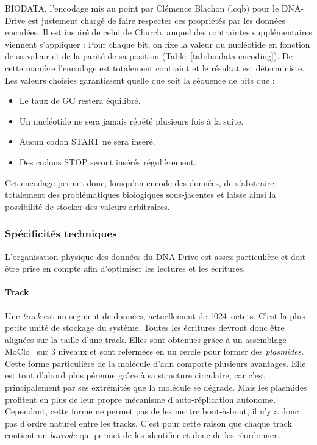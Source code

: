 \documentclass[a4paper]{report}
\begin{document}
BIODATA, l'encodage mis au point par Clémence Blachon (\ac{lcqb}) pour le DNA-Drive
est justement chargé de faire respecter ces propriétés par les données encodées.
Il est inspiré de celui de Church, auquel des contraintes supplémentaires viennent s'appliquer :
Pour chaque bit, on fixe la valeur du nucléotide en fonction de sa valeur et de la parité de sa position (Table~\ref{tab:biodata-encoding}).
De cette manière l'encodage est totalement contraint et le résultat est déterministe.
Les valeurs choisies garantissent quelle que soit la séquence de bits que :

\begin{itemize}
  \item Le taux de GC restera équilibré.
  \item Un nucléotide ne sera jamais répété plusieurs fois à la suite.
  \item Aucun codon START ne sera inséré.
  \item Des codons STOP seront insérés régulièrement.
\end{itemize}

Cet encodage permet donc, lorsqu'on encode des données, de s'abstraire totalement des problématiques biologiques sous-jacentes
et laisse ainsi la possibilité de stocker des valeurs arbitraires.

\subsubsection{Spécificités techniques}

L'organisation physique des données du DNA-Drive est assez particulière
et doit être prise en compte afin d'optimiser les lectures et les écritures.

\paragraph{Track} Une \emph{track} est un segment de données, actuellement de 1024~octets.
C'est la plus petite unité de stockage du système.
Toutes les écritures devront donc être alignées sur la taille d'une track.
Elles sont obtenues grâce à un assemblage MoClo~\cite{werner2012fast} sur 3 niveaux
et sont refermées en un cercle pour former des \emph{plasmides}.
Cette forme particulière de la molécule d'\ac{adn} comporte plusieurs avantages.
Elle est tout d'abord plus pérenne grâce à sa structure circulaire,
car c'est principalement par ses extrémités que la molécule se dégrade.
Mais les plasmides profitent en plus de leur propre mécanisme d'auto-réplication autonome.
Cependant, cette forme ne permet pas de les mettre bout-à-bout,
il n'y a donc pas d'ordre naturel entre les tracks.
C'est pour cette raison que chaque track contient un \emph{barcode} qui permet de les identifier et donc de les réordonner.
\end{document}
